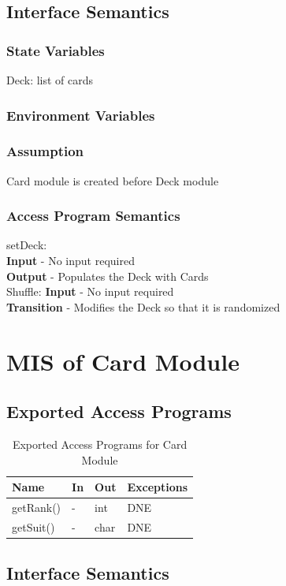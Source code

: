 \documentclass[11pt]{article}
\begin{document}
    \subsection{Interface Semantics}
    \subsubsection{State Variables}
	Deck: list of cards    
    \subsubsection{Environment Variables}
    \subsubsection{Assumption}
    Card module is created before Deck module
    \subsubsection{Access Program Semantics}
    setDeck:\\
    \textbf{Input} - No input required\\
    \textbf{Output} - Populates the Deck with Cards\\  
    Shuffle:
    \textbf{Input} - No input required\\
    \textbf{Transition} - Modifies the Deck so that it is randomized\\
 	\newline
 	\section{MIS of Card Module}
    
    \subsection{Exported Access Programs}
    \begin{table}[h]
    \caption{Exported Access Programs for Card Module}
    \begin{tabular}{p{4cm}p{2cm}p{2cm}p{4cm}}
    Name & In & Out & Exceptions\\
    \hline
    getRank() & - & int & DNE\\
    \hline
    getSuit() & - & char & DNE\\
    \hline
    \end{tabular}
    \end{table}
    \subsection{Interface Semantics}
\end{document}
